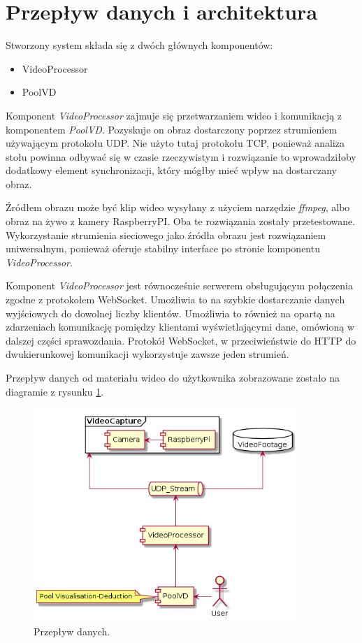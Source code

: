 \documentclass[12pt]{article}
\begin{document}
\section{Przepływ danych i architektura}

Stworzony system składa się z dwóch głównych komponentów:
\begin{itemize}[noitemsep]
    \item VideoProcessor
    \item PoolVD
\end{itemize}

Komponent \textit{VideoProcessor} zajmuje się przetwarzaniem wideo i komunikacją z komponentem \textit{PoolVD}. Pozyskuje on obraz dostarczony poprzez strumieniem używającym protokołu UDP. Nie użyto tutaj protokołu TCP, ponieważ analiza stołu powinna odbywać się w czasie rzeczywistym i rozwiązanie to wprowadziłoby dodatkowy element synchronizacji, który mógłby mieć wpływ na dostarczany obraz.

Źródłem obrazu może być klip wideo wysyłany z użyciem narzędzie \textit{ffmpeg}, albo obraz na żywo z kamery RaspberryPI. Oba te rozwiązania zostały przetestowane. Wykorzystanie strumienia sieciowego jako źródła obrazu jest rozwiązaniem uniwersalnym, ponieważ oferuje stabilny interface po stronie komponentu \textit{VideoProcessor}.

Komponent \textit{VideoProcessor} jest równocześnie serwerem obsługującym połączenia zgodne z protokołem WebSocket. Umożliwia to na szybkie dostarczanie danych wyjściowych do dowolnej liczby klientów. Umożliwia to również na opartą na zdarzeniach komunikację pomiędzy klientami wyświetlającymi dane, omówioną w dalszej części sprawozdania. Protokół WebSocket, w przeciwieństwie do HTTP do dwukierunkowej komunikacji wykorzystuje zawsze jeden strumień.

Przepływ danych od materiału wideo do użytkownika zobrazowane zostało na diagramie z rysunku \ref{dataflow}.


\begin{figure}[h]
    \centering
    \includegraphics[width=10cm]{./diagrams/out/data_flow.png}
    \caption{Przepływ danych.}
    \label{dataflow}
\end{figure}
\end{document}
